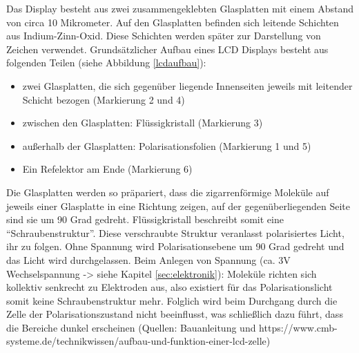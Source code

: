 Das Display besteht aus zwei zusammengeklebten Glasplatten mit einem Abstand von circa 10 Mikrometer. Auf den Glasplatten befinden sich leitende Schichten aus Indium-Zinn-Oxid. Diese Schichten werden später zur Darstellung von Zeichen verwendet. Grundsätzlicher Aufbau eines LCD Displays besteht aus folgenden Teilen (siehe Abbildung \ref{lcdaufbau}):
\begin{itemize}
\item zwei Glasplatten, die sich gegenüber liegende Innenseiten jeweils mit leitender Schicht bezogen (Markierung 2 und 4)
\item zwischen den Glasplatten: Flüssigkristall (Markierung 3)
\item außerhalb der Glasplatten: Polarisationsfolien (Markierung 1 und 5)
\item Ein Refelektor am Ende (Markierung 6)
\end{itemize}
Die Glasplatten werden so präpariert, dass die zigarrenförmige Moleküle auf jeweils einer Glasplatte in eine Richtung zeigen, auf der gegenüberliegenden Seite sind sie um 90 Grad gedreht. Flüssigkristall beschreibt somit eine “Schraubenstruktur”. Diese verschraubte Struktur veranlasst polarisiertes Licht, ihr zu folgen. Ohne Spannung wird Polarisationsebene um 90 Grad gedreht  und das Licht wird durchgelassen. Beim Anlegen von Spannung (ca. 3V Wechselspannung -> siehe Kapitel \ref{sec:elektronik}): Moleküle richten sich kollektiv senkrecht zu Elektroden aus, also existiert für das Polarisationslicht somit keine Schraubenstruktur mehr. Folglich wird beim Durchgang durch die Zelle der Polarisationszustand nicht beeinflusst, was schließlich dazu führt, dass die Bereiche dunkel erscheinen (Quellen: Bauanleitung und https://www.cmb-systeme.de/technikwissen/aufbau-und-funktion-einer-lcd-zelle)

